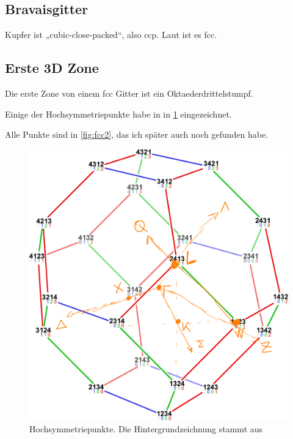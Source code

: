\subsection{Bravaisgitter}

Kupfer ist „cubic-close-packed“, also ccp.
\cite{webelements/copper/crystal_structure} Laut \cite{wikipedia/Copper} ist es
fcc.

\subsection{Erste 3D Zone}

Die erste Zone von einem fcc Gitter ist ein Oktaederdrittelstumpf.
\cite{akopian/brillouin-zones}

Einige der  Hochsymmetriepunkte habe in in \cref{fig:okt} eingezeichnet.
\cite[Kapitel~3.1, Seite~33]{Keyling/ab-initio}

Alle Punkte sind in \cref{fig:fcc2}, das ich später auch noch gefunden habe.

\begin{figure}
	\centering
	\includegraphics[width=\textwidth]{Permutohedron-Zeichnung.pdf}
	\caption{%
		Hochsymmetriepunkte. Die Hintergrundzeichnung stammt aus
		\cite{Mate2code/permutohedron}
	}
	\label{fig:okt}
\end{figure}

